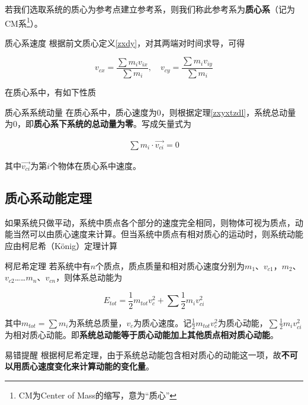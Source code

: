 若我们选取系统的质心为参考点建立参考系，则我们称此参考系为\textbf{质心系}（记为CM系\footnote{CM为Center of Mass的缩写，意为“质心”}）。

\begin{theo}[label=zxxsd]{质心系速度}{}
根据前文质心定义\eqref{zxdy}，对其两端对时间求导，可得

$$v_{cx} = \frac{\sum m_i v_{ix}}{\sum m_i} ,\quad v_{cy} = \frac{\sum m_i v_{iy}}{\sum m_i}$$
\end{theo}

在质心系中，有如下性质

\begin{theo}{质心系系统动量}{}
在质心系中，质心速度为$0$，则根据定理\eqref{zxyxtzdl}，系统总动量为$0$，即\textbf{质心系下系统的总动量为零}。写成矢量式为

\begin{subequations}
\label{e_zxxdl}
\begin{align*}
\sum m_i \cdot \vec{v_{ci}} = 0
\end{align*}
\end{subequations}

其中$\vec{v_{ci}}$为第$i$个物体在质心系中速度。
\end{theo}

\subsection{质心系动能定理}

如果系统只做平动，系统中质点各个部分的速度完全相同，则物体可视为质点，动能当然可以由质心速度来计算。但当系统中质点有相对质心的运动时，则系统动能应由柯尼希（König）定理计算

\begin{theo}[label=knxdl]{柯尼希定理}{}
若系统中有$n$个质点，质点质量和相对质心速度分别为$m_1$、$v_{c1}$，$m_2$、$v_{c2}$……$m_n$、$v_{cn}$，则体系总动能为

$$E_{tot}=\frac{1}{2} m_{tot} v_c^2 + \sum \frac{1}{2} m_i v_{ci}^2$$

其中$m_{tot} = \sum m_i$为系统总质量，$v_c$为质心速度。记$\frac{1}{2} m_{tot} v_c^2$为质心动能，$\sum \frac{1}{2} m_i v_{ci}^2$为相对质心动能。即\textbf{系统总动能等于质心动能加上其他质点相对质心动能}。
\end{theo}

\begin{mk}{易错提醒}{}
根据柯尼希定理，由于系统总动能包含相对质心的动能这一项，故\textbf{不可以用质心速度变化来计算动能的变化量}。
\end{mk}


